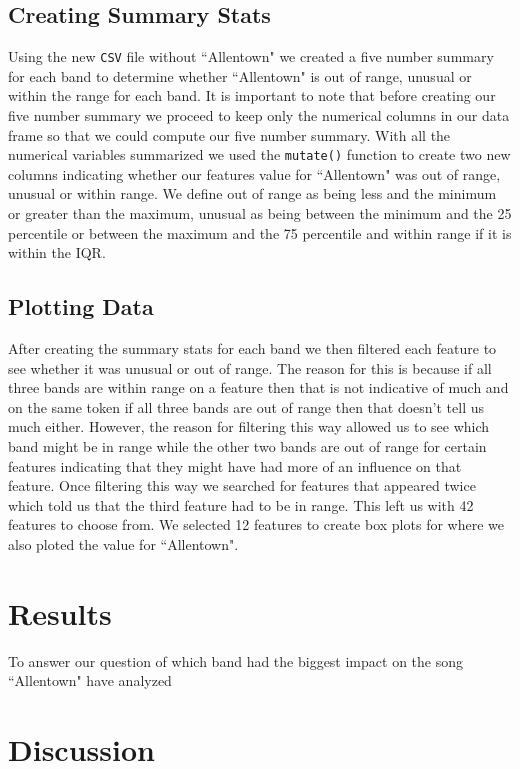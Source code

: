 \documentclass{article}\usepackage[]{graphicx}\usepackage[]{xcolor}
\begin{document}
\begin{multicols}{2}
\subsection{Creating Summary Stats}
Using the new \texttt{CSV} file without ``Allentown" we created a five number summary for each band to determine whether ``Allentown" is out of range, unusual or within the range for each band. It is important to note that before creating our five number summary we proceed to keep only the numerical columns in our data frame so that we could compute our five number summary. With all the numerical variables summarized we used the \verb|mutate()| function to create two new columns indicating whether our features value for ``Allentown" was out of range, unusual or within range. We define out of range as being less and the minimum or greater than the maximum, unusual as being between the minimum and the 25 percentile or between the maximum and the 75 percentile and within range if it is within the IQR. 


\subsection{Plotting Data}
After creating the summary stats for each band we then filtered each feature to see whether it was unusual or out of range. The reason for this is because if all three bands are within range on a feature then that is not indicative of much and on the same token if all three bands are out of range then that doesn't tell us much either. However, the reason for filtering this way allowed us to see which band might be in range while the other two bands are out of range for certain features indicating that they might have had more of an influence on that feature. Once filtering this way we searched for features that appeared twice which told us that the third feature had to be in range. This left us with 42 features to choose from. We selected 12 features to create box plots for where we also ploted the value for ``Allentown". 



\section{Results}
To answer our question of which band had the biggest impact on the song ``Allentown" have analyzed 





\section{Discussion}






\end{multicols}
\end{document}

